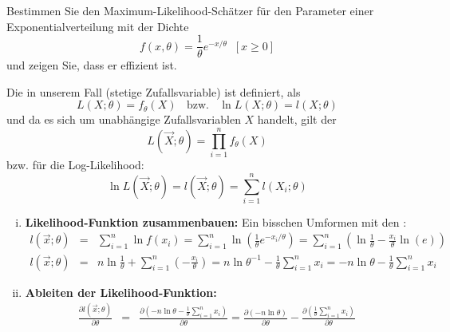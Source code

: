 \begin{uebsp}
\begin{Exercise}[label=ex:8.2]
Bestimmen Sie den Maximum-Likelihood-Schätzer für den Parameter einer Exponentialverteilung mit der Dichte \[f(x,\theta)=\frac{1}{\theta}e^{-x/\theta}\;\;[x\geq 0]\] und zeigen Sie, dass er effizient ist.
\end{Exercise}
\begin{Answer}

\begin{uebsp_theory}
Die  in unserem Fall (stetige Zufallsvariable) ist definiert, als 
\[L(X;\theta)=f_\theta(X)\;\;\text{ bzw. }\;\;\ln L(X;\theta)=l(X;\theta)\]
und da es sich um unabhängige Zufallsvariablen $X$ handelt, gilt der 
\[L(\vec X;\theta)=\prod_{i=1}^nf_\theta(X)\]
bzw. für die Log-Likelihood:
\[\ln L(\vec X;\theta)=l(\vec X;\theta)=\sum_{i=1}^nl(X_i;\theta)\]
\end{uebsp_theory}
\begin{enumerate}[i)]
    \item \textbf{Likelihood-Funktion zusammenbauen:}
    Ein bisschen Umformen mit den :
        \begin{eqnarray*}
            l(\vec x;\theta)&=&\sum_{i=1}^n\ln f(x_i) = \sum_{i=1}^n\ln\left(\frac{1}{\theta}e^{-x_i/\theta}\right)=\sum_{i=1}^n\left(\ln\frac{1}{\theta}-\frac{x_i}{\theta}\ln\left(e\right)\right)\\
            l(\vec x;\theta)&=&n\ln\frac{1}{\theta}+\sum_{i=1}^n\left(-\frac{x_i}{\theta}\right) = n\ln\theta^{-1} -\frac{1}{\theta}\sum_{i=1}^{n}x_i=-n\ln\theta -\frac{1}{\theta}\sum_{i=1}^{n}x_i
        \end{eqnarray*}
    \item \textbf{Ableiten der Likelihood-Funktion:}
        \begin{eqnarray*}
            \frac{\partial l(\vec x;\theta)}{\partial\theta}&=&\frac{\partial\left(-n\ln\theta -\frac{1}{\theta}\sum_{i=1}^{n}x_i\right)}{\partial\theta}=\frac{\partial\left(-n\ln\theta\right)}{\partial\theta} -\frac{\partial\left(\frac{1}{\theta}\sum_{i=1}^{n}x_i\right)}{\partial\theta}\\

\end{eqnarray*}
\end{enumerate}
\end{Answer}
\end{uebsp}
